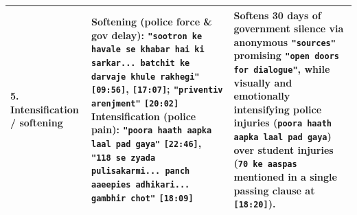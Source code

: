 \documentclass[10pt,a4paper]{article}
\begin{document}
\begin{longtable}{@{}>{\raggedright\arraybackslash}p{} >{\raggedright\arraybackslash}p{} >{\raggedright\arraybackslash}p{}@{}}
\addlinespace[4pt]
\textbf{5. Intensification / softening} & \textbf{Softening (police force \& gov delay):} \texttt{"sootron ke havale se khabar hai ki sarkar... batchit ke darvaje khule rakhegi"} \texttt{[09:56]}, \texttt{[17:07]}; \texttt{"priventiv arenjment"} \texttt{[20:02]} \newline  \textbf{Intensification (police pain):} \texttt{"poora haath aapka laal pad gaya"} \texttt{[22:46]}, \texttt{"118 se zyada pulisakarmi... panch aaeepies adhikari... gambhir chot"} \texttt{[18:09]} & Softens 30 days of government silence via anonymous \texttt{"sources"} promising \texttt{"open doors for dialogue"}, while visually and emotionally intensifying police injuries (\texttt{poora haath aapka laal pad gaya}) over student injuries (\texttt{70 ke aaspas} mentioned in a single passing clause at \texttt{[18:20]}). \\
\bottomrule
\end{longtable}
\end{document}
